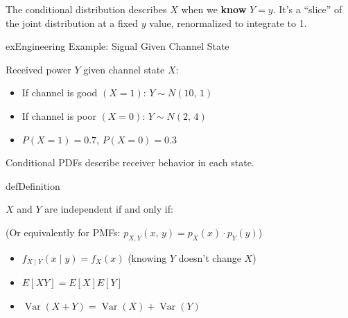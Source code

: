 





The conditional distribution describes $X$ when we \textbf{know} $Y = y$. It’s a ``slice'' of the joint distribution at a fixed $y$ value, renormalized to integrate to 1.

\begin{PSbox}[unbreakable]{ex}{Engineering Example: Signal Given Channel State}

Received power $Y$ given channel state $X$:

\begin{itemize}
\tightlist
\item
  If channel is good $(X = 1)$: $Y \sim N(10,\, 1)$
\item
  If channel is poor $(X = 0)$: $Y \sim N(2,\, 4)$
\item
  $P(X = 1) = 0.7,\, P(X = 0) = 0.3$
\end{itemize}

Conditional PDFs describe receiver behavior in each state.

\end{PSbox}


\begin{PSbox}[unbreakable]{def}{Definition}

$X$ and $Y$ are independent if and only if:


(Or equivalently for PMFs: $p_{X,Y}(x,\,y) = p_{X}(x) \cdot p_{Y}(y)$)

\end{PSbox}


\begin{itemize}
\tightlist
\item
  $f_{X \mid Y}(x \mid y) = f_{X}(x)$ (knowing $Y$ doesn’t change $X$)
\item
  $E[XY] = E[X]E[Y]$
\item
  $\operatorname{Var}(X + Y) = \operatorname{Var}(X) + \operatorname{Var}(Y)$
\end{itemize}

